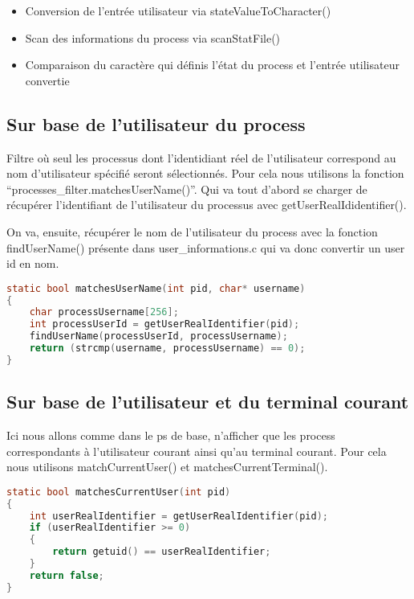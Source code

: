 \begin{itemize}
\item Conversion de l'entrée utilisateur via stateValueToCharacter()
\item Scan des informations du process via scanStatFile()
\item Comparaison du caractère qui définis l'état du process et l'entrée utilisateur convertie
\end{itemize}


\subsection{Sur base de l’utilisateur du process}
Filtre où seul les processus dont l’identidiant réel de l'utilisateur correspond au nom d'utilisateur spécifié seront sélectionnés. Pour cela nous utilisons la fonction “processes\_filter.matchesUserName()”. Qui va tout d’abord se charger de récupérer l’identifiant de l’utilisateur du processus avec getUserRealIdidentifier().

On va, ensuite, récupérer le nom de l'utilisateur du process avec la fonction findUserName() présente dans user\_informations.c qui va donc convertir un user id en nom.

\begin{lstlisting}[frame=single, language=c]
static bool matchesUserName(int pid, char* username)
{
    char processUsername[256];
    int processUserId = getUserRealIdentifier(pid);
    findUserName(processUserId, processUsername);
    return (strcmp(username, processUsername) == 0);
}
\end{lstlisting}



\subsection{Sur base de l’utilisateur et du terminal courant} 
Ici nous allons comme dans le ps de base, n'afficher que les process correspondants à l'utilisateur courant ainsi qu'au terminal courant. Pour cela nous utilisons matchCurrentUser() et matchesCurrentTerminal().

\begin{lstlisting}[frame=single, language=c]
static bool matchesCurrentUser(int pid)
{
    int userRealIdentifier = getUserRealIdentifier(pid);
    if (userRealIdentifier >= 0)
    {
        return getuid() == userRealIdentifier;
    }
    return false;
}
\end{lstlisting}

